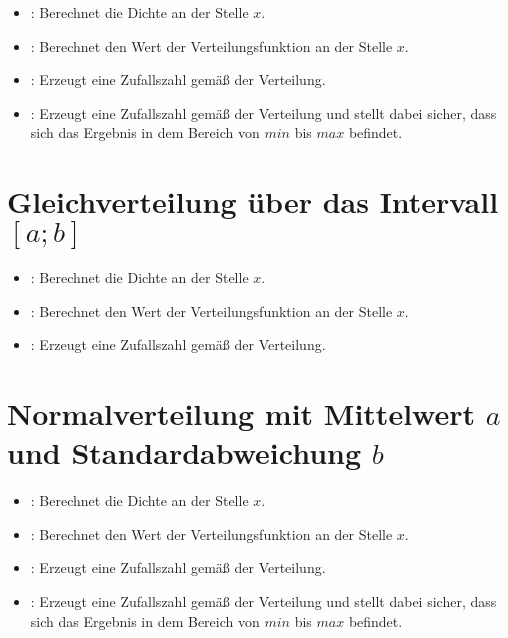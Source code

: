 \begin{itemize}

\item
{}:
Berechnet die Dichte an der Stelle $x$.

\item
{}:
Berechnet den Wert der Verteilungsfunktion an der Stelle $x$.

\item
{}:
Erzeugt eine Zufallszahl gemäß der Verteilung.

\item
{}:
Erzeugt eine Zufallszahl gemäß der Verteilung und stellt dabei sicher, dass sich das Ergebnis in dem Bereich von $min$ bis $max$ befindet.

\end{itemize}



\section{Gleichverteilung über das Intervall \texorpdfstring{$[a;b]$}{[a;b]}}

\begin{itemize}

\item
{}:
Berechnet die Dichte an der Stelle $x$.

\item
{}:
Berechnet den Wert der Verteilungsfunktion an der Stelle $x$.

\item
{}:
Erzeugt eine Zufallszahl gemäß der Verteilung.

\end{itemize}



\section{Normalverteilung mit Mittelwert \texorpdfstring{$a$}{a} und Standardabweichung \texorpdfstring{$b$}{b}}

\begin{itemize}

\item
{}:
Berechnet die Dichte an der Stelle $x$.

\item
{}:
Berechnet den Wert der Verteilungsfunktion an der Stelle $x$.

\item
{}:
Erzeugt eine Zufallszahl gemäß der Verteilung.

\item
{}:
Erzeugt eine Zufallszahl gemäß der Verteilung und stellt dabei sicher, dass sich das Ergebnis in dem Bereich von $min$ bis $max$ befindet.

\end{itemize}



